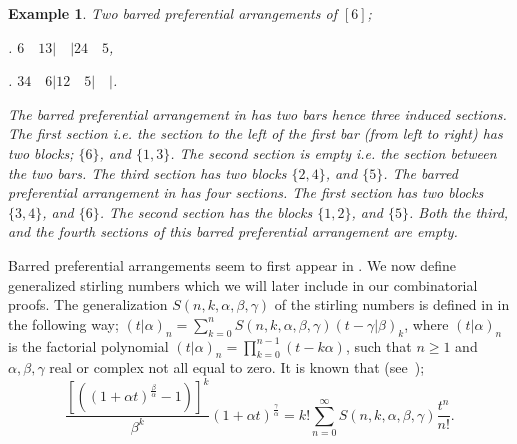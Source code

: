 \documentclass[12pt]{amsart}
\newcommand{\RNum}[1]{\lowercase\expandafter{\romannumeral #1\relax}}
\newtheorem{proof 1}{proof 1}
\newtheorem{example}{Example}[section]
\begin{document}
		\begin{example}Two barred preferential arrangements of $[6]$;
			
			\RNum{1}. $6\quad13|\quad|24\quad5$,
			
			\RNum{2}. $34\quad6|12\quad5|\quad|$.
			
			The barred preferential arrangement in \RNum{1} has two bars hence three induced sections. The first section i.e. the section to the left of the first bar (from left to right) has two blocks; $\{6\}$, and $\{1,3\}$. The second section is empty i.e. the section between the two bars. The third section has two blocks $\{2,4\}$, and $\{5\}$. The barred preferential arrangement in \RNum{2} has four sections. The first section has two blocks $\{3,4\}$, and $\{6\}$. The second section has the blocks $\{1,2\}$, and $\{5\}$. Both the third, and the fourth sections of this barred preferential arrangement are empty.
			
		\end{example}
	 Barred preferential arrangements seem to first appear in \cite{ahlbach2013barred,pippenger2010hypercube}. We now define generalized stirling numbers which we will later include in our combinatorial proofs. The generalization $S(n,k,\alpha,\beta,\gamma)$ of the stirling numbers  is defined in \cite{hsu1998unified} in the following way; $(t|\alpha)_n=\sum\limits_{k=0}^{n}S(n,k,\alpha,\beta,\gamma)(t-\gamma|\beta)_k$, where $(t|\alpha)_n$ is the factorial polynomial $(t|\alpha)_n=\prod\limits_{k=0}^{n-1}(t-k\alpha)$, such that $n\geq1$ and $\alpha,\beta,\gamma$ real or complex not all equal to zero. It is known that (see~\cite{hsu1998unified});
\begin{equation}\label{equation:3}
	\frac{[((1+\alpha t)^\frac{\beta}{\alpha}-1)]^k}{\beta^k}(1+\alpha t)^{\frac{\gamma}{\alpha}}=k!\sum\limits_{n=0}^{\infty}S(n,k,\alpha,\beta,\gamma)\frac{t^n}{n!}.
\end{equation}
\end{document}
